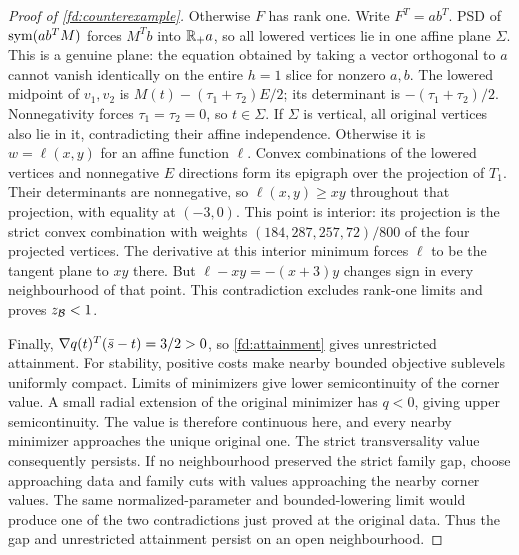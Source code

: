 \begin{proof}[Proof of \cref{fd:counterexample}]
Otherwise $F$ has rank one. Write $F^T=ab^T$.
PSD of $\operatorname{sym}(a b^TM)$ forces $M^Tb$ into $\mathbb R_+a$,
so all lowered vertices lie in one affine plane $\Sigma$.
This is a genuine plane: the equation obtained by taking
a vector orthogonal to $a$ cannot vanish identically
on the entire $h=1$ slice for nonzero $a,b$.
The lowered midpoint of $v_1,v_2$ is
$M(t)-(\tau_1+\tau_2)E/2$; its determinant is
$-(\tau_1+\tau_2)/2$. Nonnegativity forces
$\tau_1=\tau_2=0$, so $t\in\Sigma$.
If $\Sigma$ is vertical, all original vertices also
lie in it, contradicting their affine independence.
Otherwise it is $w=\ell(x,y)$ for an affine function
$\ell$. Convex combinations of the lowered vertices
and nonnegative $E$ directions form its epigraph
over the projection of $T_1$. Their determinants
are nonnegative, so $\ell(x,y)\ge xy$ throughout
that projection, with equality at $(-3,0)$.
This point is interior: its projection is the strict
convex combination with weights
$(184,287,257,72)/800$ of the four projected vertices.
The derivative at this interior minimum forces
$\ell$ to be the tangent plane to $xy$ there.
But $\ell-xy=-(x+3)y$ changes sign in every
neighbourhood of that point. This contradiction
excludes rank-one limits and proves $z_{\mathcal B}<1$.

Finally, $\nabla q(t)^T(\bar s-t)=3/2>0$, so
\cref{fd:attainment} gives unrestricted attainment.
For stability, positive costs make nearby bounded
objective sublevels uniformly compact. Limits of
minimizers give lower semicontinuity of the corner
value. A small radial extension of the original
minimizer has $q<0$, giving upper semicontinuity.
The value is therefore continuous here, and every
nearby minimizer approaches the unique original one.
The strict transversality value consequently persists.
If no neighbourhood preserved the strict family gap,
choose approaching data and family cuts with values
approaching the nearby corner values. The same
normalized-parameter and bounded-lowering limit
would produce one of the two contradictions just
proved at the original data. Thus the gap and
unrestricted attainment persist on an open neighbourhood.
\end{proof}

